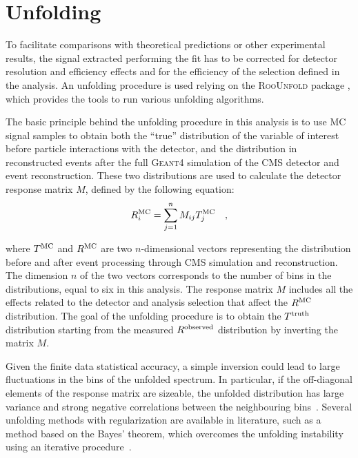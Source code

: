 \section{Unfolding}
\label{sec:Unfolding}

To facilitate comparisons with theoretical predictions or other experimental results, the signal
extracted performing the fit has to be corrected for detector resolution and
efficiency effects and for the efficiency of the selection defined in the
analysis.
An unfolding procedure is used relying on the \textsc{RooUnfold} package
\cite{Adye:2011gm}, which provides the tools to run various unfolding
algorithms.

The basic principle behind the unfolding procedure in this analysis is to use MC signal samples to obtain both the ``true'' distribution of the variable of interest before particle interactions with the detector, and the distribution in reconstructed events after the full \textsc{Geant4} simulation of the CMS detector and event reconstruction.
These two distributions are used to calculate the detector response matrix $M$, defined by the following equation:
\begin{equation}\label{eq:resp_matrix}
R_{i}^{\rm {MC}} = \sum_{j=1}^{n} M_{ij}T_{j}^{\rm {MC}} \quad ,
\end{equation}

\noindent where $T^{\rm{MC}}$ and $R^{\rm{MC}}$ are two $n$-dimensional vectors
representing the distribution before and after event processing through CMS
simulation and reconstruction. The dimension $n$ of the two vectors corresponds 
to the number of bins in the distributions, equal to six in this analysis.
The response matrix $M$ includes all the effects related to the detector and analysis selection that affect the $R^{\rm{MC}}$ distribution.
The goal of the unfolding procedure is to obtain the $T^{\rm{truth}}$ distribution starting from the measured
$R^{\rm{observed}}$ distribution by inverting the matrix $M$.

Given the finite data statistical accuracy, a simple inversion could lead to large fluctuations in the bins of the unfolded spectrum. In particular, if the off-diagonal elements of the response matrix are sizeable, the unfolded distribution has large variance and strong negative correlations between the neighbouring bins~\cite{Cowan:2002in}. Several unfolding methods with regularization are available in literature, such as a method based on the Bayes' theorem, which overcomes the unfolding instability using an iterative procedure~\cite{DAgostini:1994zf}.

